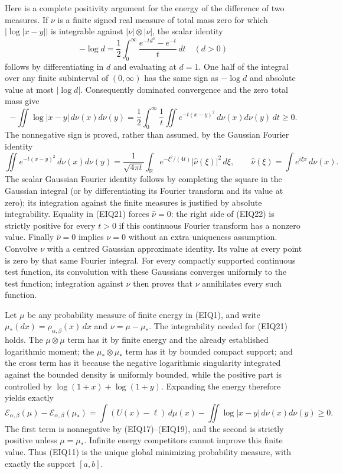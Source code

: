 \documentclass[11pt,a4paper]{article}
\begin{document}
Here is a complete positivity argument for the energy of the difference
of two measures.  If $\nu$ is a finite signed real measure of total mass
zero for which $|\log|x-y||$ is integrable against
$|\nu|\otimes|\nu|$, the scalar identity
\begin{equation}\tag{EIQ20}
 -\log d=\frac12\int_0^\infty
           \frac{e^{-td^2}-e^{-t}}t\,dt\quad(d>0)
\end{equation}
follows by differentiating in $d$ and evaluating at $d=1$.
One half of the integral over any finite subinterval of $(0,\infty)$
has the same sign as $-\log d$ and absolute value at most $|\log d|$.
Consequently dominated convergence and the zero total mass give
\begin{equation}\tag{EIQ21}
 -\iint\log|x-y|\,d\nu(x)d\nu(y)
 =\frac12\int_0^\infty\frac1t
       \iint e^{-t(x-y)^2}\,d\nu(x)d\nu(y)\,dt\geq0.
\end{equation}
The nonnegative sign is proved, rather than assumed, by the Gaussian
Fourier identity
\begin{equation}\tag{EIQ22}
 \iint e^{-t(x-y)^2}\,d\nu(x)d\nu(y)
 =\frac1{\sqrt{4\pi t}}\int_{\mathbb R}
          e^{-\xi^2/(4t)}|\widehat\nu(\xi)|^2\,d\xi,
 \qquad \widehat\nu(\xi)=\int e^{i\xi x}\,d\nu(x).
\end{equation}
The scalar Gaussian Fourier identity follows by completing the square
in the Gaussian integral (or by differentiating its Fourier transform
and its value at zero); its integration against the finite measures is
justified by absolute integrability.  Equality in (EIQ21) forces
$\widehat\nu=0$: the right side of (EIQ22) is strictly positive for every
$t>0$ if this continuous Fourier transform has a nonzero value.
Finally $\widehat\nu=0$ implies $\nu=0$ without an extra uniqueness
assumption. Convolve $\nu$ with a centred Gaussian approximate identity.
Its value at every point is zero by that same Fourier integral.
For every compactly supported continuous test function, its convolution
with these Gaussians converges uniformly to the test function; integration
against $\nu$ then proves that $\nu$ annihilates every such function.

Let $\mu$ be any probability measure of finite energy in (EIQ1), and
write $\mu_*(dx)=\rho_{\alpha,\beta}(x)\,dx$ and $\nu=\mu-\mu_*$.
The integrability needed for (EIQ21) holds.  The $\mu\otimes\mu$ term
has it by finite energy and the already established logarithmic moment;
the $\mu_*\otimes\mu_*$ term has it by bounded compact support; and the
cross term has it because the negative logarithmic singularity integrated
against the bounded density is uniformly bounded, while the positive
part is controlled by $\log(1+x)+\log(1+y)$.
Expanding the energy therefore yields exactly
\begin{equation}\tag{EIQ23}
 \mathcal E_{\alpha,\beta}(\mu)-
       \mathcal E_{\alpha,\beta}(\mu_*)
 =\int(U(x)-\ell)\,d\mu(x)
       -\iint\log|x-y|\,d\nu(x)d\nu(y)\geq0.
\end{equation}
The first term is nonnegative by (EIQ17)--(EIQ19), and the second is
strictly positive unless $\mu=\mu_*$. Infinite energy competitors cannot
improve this finite value. Thus (EIQ11) is the unique global minimizing
probability measure, with exactly the support $[a,b]$.
\end{document}
